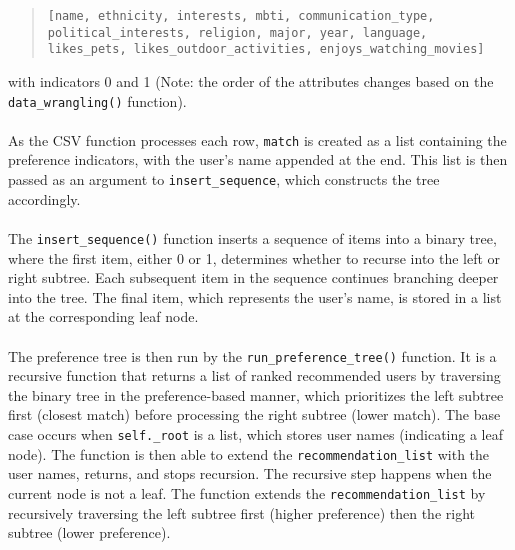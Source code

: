 \documentclass[fontsize=11pt]{article}
\begin{document}
\begin{quote}
\texttt{[name, ethnicity, interests, mbti, communication\_type,} \\
\texttt{political\_interests, religion, major, year, language,} \\
\texttt{likes\_pets, likes\_outdoor\_activities, enjoys\_watching\_movies]}
\end{quote}
with indicators 0 and 1 (Note: the order of the attributes changes based on the \texttt{data\_wrangling()} function).
\\
\\
As the CSV function processes each row, \texttt{match} is created as a list containing the preference indicators, with the user's name appended at the end. This list is then passed as an argument to \texttt{insert\_sequence}, which constructs the tree accordingly.
\\
\\
The \texttt{insert\_sequence()} function inserts a sequence of items into a binary tree, where the first item, either 0 or 1, determines whether to recurse into the left or right subtree.
Each subsequent item in the sequence continues branching deeper into the tree. The final item, which represents the user’s name, is stored in a list at the corresponding leaf node.
\\
\\
The preference tree is then run by the \texttt{run\_preference\_tree()} function. It is a recursive function that returns a list of ranked recommended users by traversing the binary tree in the preference-based manner,
which prioritizes the left subtree first (closest match) before processing the right subtree (lower match). The base case occurs when \texttt{self.\_root} is a list,
which stores user names (indicating a leaf node). The function is then able to extend the \texttt{recommendation\_list} with the user names, returns, and stops recursion.
The recursive step happens when the current node is not a leaf. The function extends the \texttt{recommendation\_list} by recursively traversing the left subtree first (higher preference) then
the right subtree (lower preference).
\end{document}
